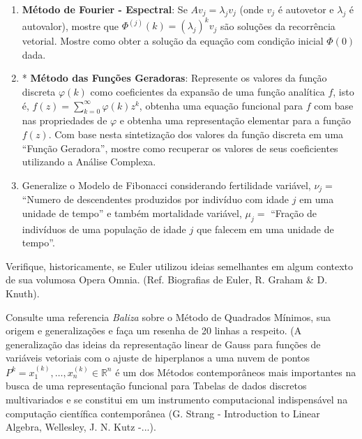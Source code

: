 \begin{exercise}
\begin{enumerate}
\item \textbf{Método de Fourier - Espectral}: Se \(A v_j = \lambda_j v_j\) (onde \(v_j\) é autovetor e \(\lambda_j\) é autovalor), mostre que \(\Phi^{(j)}(k) = (\lambda_j)^{k} v_j\) são soluções da recorrência vetorial. Mostre como obter a solução da equação com condição inicial \(\Phi(0)\) dada.
\item* \textbf{Método das Funções Geradoras}: Represente os valores da função discreta \(\varphi(k)\) como coeficientes da expansão de uma função analítica \(f\), isto é, \(f(z) = \displaystyle \sum_{k=0}^{\infty} \varphi(k) z^k\), obtenha uma equação funcional para \(f\) com base nas propriedades de \(\varphi\) e obtenha uma representação elementar para a função \(f(z)\). Com base nesta sintetização dos valores da função discreta em uma ``Função Geradora'', mostre como recuperar os valores de seus coeficientes utilizando a Análise Complexa.
\item Generalize o Modelo de Fibonacci considerando fertilidade variável, \(\nu_j =\) ``Numero de descendentes produzidos por indivíduo com idade \(j\) em uma unidade de tempo'' e também mortalidade variável, \(\mu_j =\) ``Fração de indivíduos de uma população de idade \(j\) que falecem em uma unidade de tempo''.
\end{enumerate}
\end{exercise}



\begin{exercise}
Verifique, historicamente, se Euler utilizou ideias semelhantes em algum contexto de sua volumosa Opera Omnia. (Ref. Biografias de Euler, R. Graham \& D. Knuth).
\end{exercise}

\begin{exercise}
Consulte uma referencia \textit{Baliza} sobre o Método de Quadrados Mínimos, sua origem e generalizações e faça um resenha de 20 linhas a respeito. (A generalização das ideias da
representação linear de Gauss para funções de variáveis vetoriais com o ajuste de hiperplanos a uma nuvem de pontos \(P^k = x_1^{(k)}, \ldots, x_n^{(k)} \in \mathbb{R}^n\) é um dos Métodos contemporâneos mais importantes na busca de uma representação funcional para Tabelas de dados discretos multivariados e se constitui em um instrumento computacional
indispensável na computação científica contemporânea (G. Strang - Introduction to Linear Algebra, Wellesley, J. N. Kutz -...).
\end{exercise}



